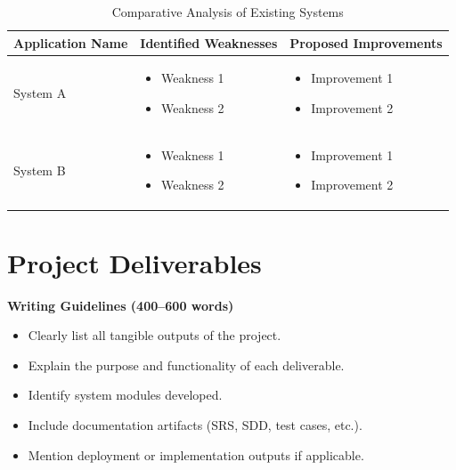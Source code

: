 \begin{table}[h!]
\centering
\caption{Comparative Analysis of Existing Systems}
\renewcommand{\arraystretch}{1.3}

\begin{tabularx}{\textwidth}{|p{3cm}|X|X|}
\hline
\textbf{Application Name} & \textbf{Identified Weaknesses} & \textbf{Proposed Improvements} \\
\hline
System A &
\begin{itemize}[leftmargin=*, noitemsep, topsep=0pt]
    \item Weakness 1
    \item Weakness 2
\end{itemize}
&
\begin{itemize}[leftmargin=*, noitemsep, topsep=0pt]
    \item Improvement 1
    \item Improvement 2
\end{itemize}
\\
\hline
System B &
\begin{itemize}[leftmargin=*, noitemsep, topsep=0pt]
    \item Weakness 1
    \item Weakness 2
\end{itemize}
&
\begin{itemize}[leftmargin=*, noitemsep, topsep=0pt]
    \item Improvement 1
    \item Improvement 2
\end{itemize}
\\
\hline

\end{tabularx}
\end{table}




\section{Project Deliverables}

\textbf{Writing Guidelines (400–600 words)}

\begin{itemize}
    \item Clearly list all tangible outputs of the project.
    \item Explain the purpose and functionality of each deliverable.
    \item Identify system modules developed.
    \item Include documentation artifacts (SRS, SDD, test cases, etc.).
    \item Mention deployment or implementation outputs if applicable.
\end{itemize}

